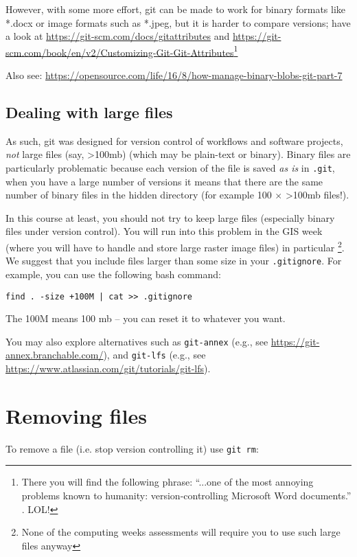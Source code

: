 However, with some more effort, git can be made to work for binary formats like *.docx or image formats 
such as *.jpeg, but it is harder to compare versions; have a look at 
\url{https://git-scm.com/docs/gitattributes} and 
\url{https://git-scm.com/book/en/v2/Customizing-Git-Git-Attributes}\footnote{There you will find the following phrase: ``...one of the most annoying problems known to humanity: version-controlling Microsoft Word documents.'' . LOL!} 

Also see: \url{https://opensource.com/life/16/8/how-manage-binary-blobs-git-part-7}
  
\subsection{Dealing with large files}

As such, git was designed for version control of workflows and software 
projects, {\it not} large files (say, >100mb) (which may be plain-text 
or binary). Binary files are particularly problematic because each version of
the file is saved {\it as is} in \texttt{.git}, when you have a large 
number of versions it means that there
are the same number of binary files in the hidden directory (for example
100 $\times$ >100mb files!). 

In this course at least, you should not try to keep large files 
(especially binary files under version control). You will run into this 
problem in the GIS week (where you will have to handle and store large 
raster image files) in particular \footnote{None of the computing weeks 
assessments will require you to use such large files anyway}. We 
suggest that you include files larger than some size in your 
{\tt .gitignore}.  For example, you can use the following bash command: 
\begin{lstlisting}
find . -size +100M | cat >> .gitignore	
\end{lstlisting}
The 100M means 100 mb -- you can reset it to whatever you want.  

You may also explore alternatives such as {\tt git-annex} 
(e.g., see \url{https://git-annex.branchable.com/}), and {\tt git-lfs} 
(e.g., see \url{https://www.atlassian.com/git/tutorials/git-lfs}).   

\section{Removing files}

To remove a file (i.e. stop version controlling it) use {\tt git rm}:

